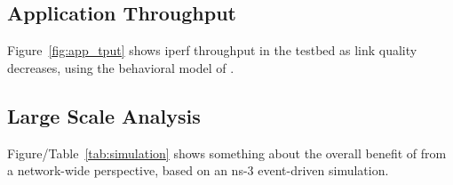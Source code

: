 \subsection{Application Throughput}
Figure~\ref{fig:app_tput} shows iperf throughput in the testbed as link quality
decreases, using the behavioral model of \OurSys. 

\subsection{Large Scale Analysis}
Figure/Table~\ref{tab:simulation} shows something about the overall benefit of \OurSys from a network-wide perspective, based on an ns-3 event-driven simulation.




